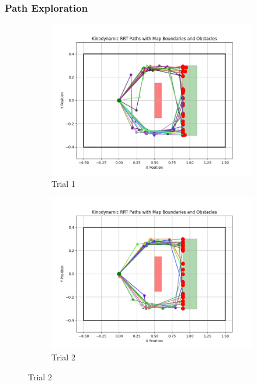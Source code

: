 \documentclass[12pt]{article}
\begin{document}
\subsubsection{Path Exploration}
\begin{figure}[h!]
    \centering
    \begin{subfigure}{0.45\textwidth}
        \centering
        \includegraphics[width=\textwidth]{./images/5.png}
        \caption{Trial 1}
        \label{fig:tree_1}
    \end{subfigure}
    \hfill
    \begin{subfigure}{0.45\textwidth}
        \centering
        \includegraphics[width=\textwidth]{./images/10.png}
        \caption{Trial 2}
        \label{fig:tree_2}
    \end{subfigure}
    

\end{figure}
\end{document}
